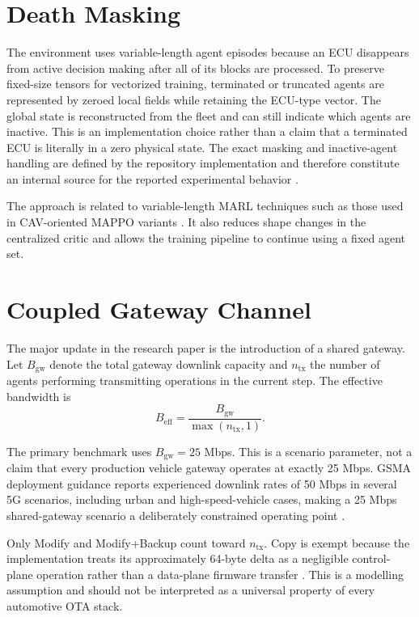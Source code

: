 \documentclass{iutbscthesis}
\begin{document}
\section{Death Masking}
The environment uses variable-length agent episodes because an ECU disappears from active decision making after all of its blocks are processed. To preserve fixed-size tensors for vectorized training, terminated or truncated agents are represented by zeroed local fields while retaining the ECU-type vector. The global state is reconstructed from the fleet and can still indicate which agents are inactive. This is an implementation choice rather than a claim that a terminated ECU is literally in a zero physical state. The exact masking and inactive-agent handling are defined by the repository implementation and therefore constitute an internal source for the reported experimental behavior \parencite{ma_reles_ota_repo}.

The approach is related to variable-length MARL techniques such as those used in CAV-oriented MAPPO variants \parencite{guo2024mappopis}. It also reduces shape changes in the centralized critic and allows the training pipeline to continue using a fixed agent set.

\section{Coupled Gateway Channel}
The major update in the research paper is the introduction of a shared gateway. Let $B_{\mathrm{gw}}$ denote the total gateway downlink capacity and $n_{\mathrm{tx}}$ the number of agents performing transmitting operations in the current step. The effective bandwidth is
\begin{equation}
B_{\mathrm{eff}}=\frac{B_{\mathrm{gw}}}{\max(n_{\mathrm{tx}},1)}.
\label{eq:gateway}
\end{equation}

The primary benchmark uses $B_{\mathrm{gw}}=25$ Mbps. This is a scenario parameter, not a claim that every production vehicle gateway operates at exactly 25 Mbps. GSMA deployment guidance reports experienced downlink rates of 50 Mbps in several 5G scenarios, including urban and high-speed-vehicle cases, making a 25 Mbps shared-gateway scenario a deliberately constrained operating point \parencite{gsma2019fiveg}.

Only Modify and Modify+Backup count toward $n_{\mathrm{tx}}$. Copy is exempt because the implementation treats its approximately 64-byte delta as a negligible control-plane operation rather than a data-plane firmware transfer \parencite{ma_reles_ota_repo}. This is a modelling assumption and should not be interpreted as a universal property of every automotive OTA stack.
\end{document}
